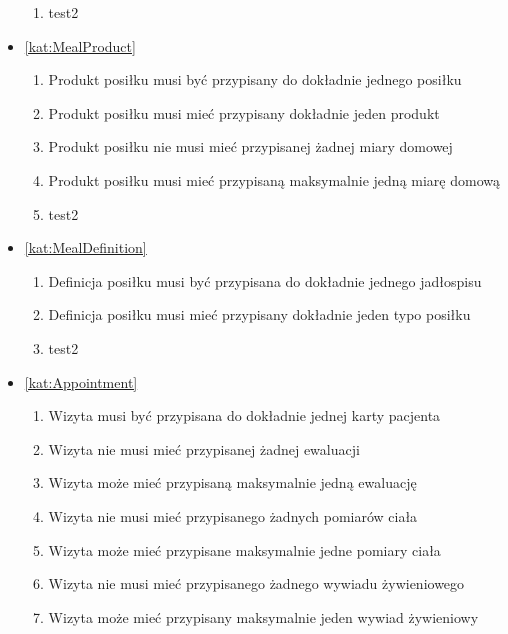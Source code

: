 \begin{itemize}[label={\textbf{Reguły dla}}, wide, labelwidth=!, labelindent=0pt]
\begin{enumerate}[label={\textbf{REG/\protect\threedigits{\arabic{enumi}}}}, wide, labelwidth=!, align=left, leftmargin=3cm, resume]
        \item test2
    \end{enumerate}
    \item\ref{kat:MealProduct}
    \begin{enumerate}[label={\textbf{REG/\protect\threedigits{\arabic{enumi}}}}, wide, labelwidth=!, align=left, leftmargin=3cm, resume]
        \item Produkt posiłku musi być przypisany do dokładnie jednego posiłku
        \item Produkt posiłku musi mieć przypisany dokładnie jeden produkt
        \item Produkt posiłku nie musi mieć przypisanej żadnej miary domowej
        \item Produkt posiłku musi mieć przypisaną maksymalnie jedną miarę domową
        \item test2
    \end{enumerate}
    \item\ref{kat:MealDefinition}
    \begin{enumerate}[label={\textbf{REG/\protect\threedigits{\arabic{enumi}}}}, wide, labelwidth=!, align=left, leftmargin=3cm, resume]
        \item Definicja posiłku musi być przypisana do dokładnie jednego jadłospisu
        \item Definicja posiłku musi mieć przypisany dokładnie jeden typo posiłku
        \item test2
    \end{enumerate}
    \item\ref{kat:Appointment}
    \begin{enumerate}[label={\textbf{REG/\protect\threedigits{\arabic{enumi}}}}, wide, labelwidth=!, align=left, leftmargin=3cm, resume]
        \item Wizyta musi być przypisana do dokładnie jednej karty pacjenta
        \item Wizyta nie musi mieć przypisanej żadnej ewaluacji
        \item Wizyta może mieć przypisaną maksymalnie jedną ewaluację
        \item Wizyta nie musi mieć przypisanego żadnych pomiarów ciała
        \item Wizyta może mieć przypisane maksymalnie jedne pomiary ciała
        \item Wizyta nie musi mieć przypisanego żadnego wywiadu żywieniowego
        \item Wizyta może mieć przypisany maksymalnie jeden wywiad żywieniowy

\end{enumerate}
\end{itemize}
